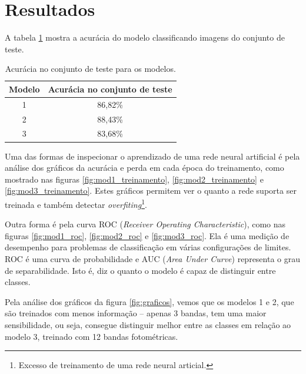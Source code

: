 \section{Resultados}

A tabela \ref{tab:eval} mostra a acurácia do modelo classificando imagens do conjunto de teste.

\begin{table}[h!]
  \centering

  \caption{Acurácia no conjunto de teste para os modelos.}
  \label{tab:eval}

  \begin{tabular}{cc}
    \toprule
    Modelo & Acurácia no conjunto de teste \\
    \midrule
    1      & 86,82\%                       \\
    2      & 88,43\%                       \\
    3      & 83,68\%                       \\
    \bottomrule
  \end{tabular}
\end{table}


Uma das formas de inspecionar o aprendizado de uma rede neural artificial é pela análise dos gráficos da acurácia e perda em cada época do treinamento, como mostrado nas figuras \ref{fig:mod1_treinamento}, \ref{fig:mod2_treinamento} e \ref{fig:mod3_treinamento}. Estes gráficos permitem ver o quanto a rede suporta ser treinada e também detectar \emph{overfiting}\footnote{Excesso de treinamento de uma rede neural articial.}.

Outra forma é pela curva ROC (\emph{Receiver Operating Characteristic}), como nas figuras \ref{fig:mod1_roc}, \ref{fig:mod2_roc} e \ref{fig:mod3_roc}. Ela é uma medição de desempenho para problemas de classificação em várias configurações de limites. ROC é uma curva de probabilidade e AUC (\emph{Area Under Curve}) representa o grau de separabilidade. Isto é, diz o quanto o modelo é capaz de distinguir entre classes. \cite{Fawcett2006,Hanley1982}

Pela análise dos gráficos da figura \ref{fig:graficos}, vemos que os modelos 1 e 2, que são treinados com menos informação -- apenas 3 bandas, tem uma maior sensibilidade, ou seja, consegue distinguir melhor entre as classes em relação ao modelo 3, treinado com 12 bandas fotométricas.


